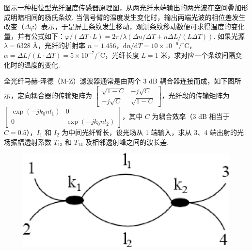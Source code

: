 \documentclass{assignment}
\begin{document}
\begin{prob}
    图示一种相位型光纤温度传感器原理图，从两光纤末端输出的两光波在空间叠加形成明暗相间的杨氏条纹. 当信号臂的温度发生变化时，输出两端光波的相位差发生改变（$\Delta\varphi$）表示，于是屏上条纹发生移动，观测条纹移动数便可求得温度的变化量，并有公式如下：$\varphi/(\Delta T\cdot L)=2\pi/\lambda(\Delta n/\Delta T+n\Delta L/(L\Delta T))$. 如果光源 $\lambda=6328$ \AA，光纤的折射率 $n=1.456$，$\mathrm{d}n/\mathrm{d}T=10\times 10^{-6}/^{\circ}$C，$\alpha=\Delta L/(L\cdot\Delta T)=5\times 10^{-7}/^{\circ}$C，光纤长度 $L=1$ 米，求对应一个条纹间隔变化时的温度的变化.
\end{prob}
\begin{sol}
    
\end{sol}

\begin{prob}
    全光纤马赫-泽德（M-Z）滤波器通常是由两个 $3$ dB 耦合器连接而成，如下图所示，定向耦合器的传输矩阵为 $\begin{bmatrix}
        \sqrt{1-C}&-j\sqrt{C}\\
        -j\sqrt{C}&\sqrt{1-C}
    \end{bmatrix}$，光纤段的传输矩阵为 $\begin{bmatrix}
        \exp(-jk_0nl_1)&0\\
        0&\exp(-jk_0nl_2)
    \end{bmatrix}$，其中 $C$ 为耦合效率（$3$ dB 相当于 $C=0.5$），$I_1$ 和 $I_2$ 为中间光纤臂长，设光场从 1 端输入，求从 3、4 端出射的光场振幅透射系数 $T_{13}$ 和 $T_{14}$ 及相邻透射峰之间的波长差.
    \begin{figure}[h]
        \centering
        \includegraphics[width=.5\columnwidth]{4-3.png}
    \end{figure}
\end{prob}
\begin{sol}
    
\end{sol}
\end{document}

